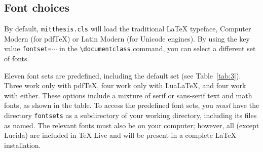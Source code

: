 \documentclass[11pt]{article}
\newcommand*\pdfTeX{pdf\TeX}
\newcommand*\LuaLaTeX{Lua\LaTeX}
\begin{document}
\begin{table}
\caption{Options to the document class\label{tab:2}}
\smallskip\setlength\extrarowheight{3pt}%
%
\end{table}

\subsection{Font choices}
By default, \texttt{mitthesis.cls} will load the traditional \LaTeX{} typeface, Computer Modern (for \pdfTeX) or Latin Modern (for Unicode engines).  By using the key value \texttt{fontset=$\cdots$} in the \verb|\documentclass| command, you can select a different set of fonts.  

Eleven font sets are predefined, including the default set (see Table~\ref{tab:3}).  Three work only with \pdfTeX, four work only with \LuaLaTeX, and four work with either.  These options include a mixture of serif or sans-serif text and math fonts, as shown in the table. To access the predefined font sets, you \emph{must} have the directory \texttt{fontsets} as a subdirectory of your working directory, including its files as named. The relevant fonts must also be on your computer; however, all (except Lucida) are included in \TeX{} Live and will be present in a complete \LaTeX{} installation.
\end{document}
